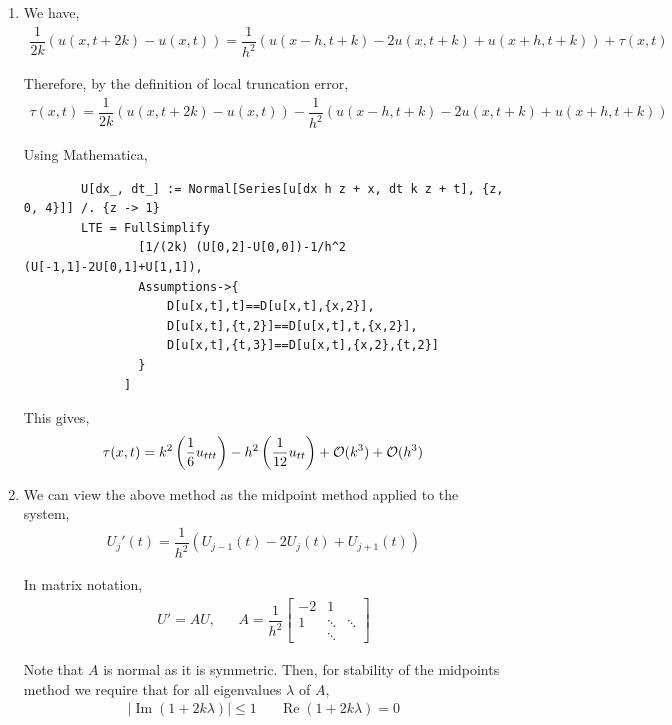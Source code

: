 \documentclass[10pt]{article}
\begin{document}
\begin{solution}[Solution]

\begin{enumerate}[label=(\alph*)]
    \item We have,
    \begin{align*}
        \dfrac{1}{2k}(u(x,t+2k) - u(x,t)) = \dfrac{1}{h^2} \left( u(x-h,t+k) - 2u(x,t+k) + u(x+h,t+k) \right) + \tau(x,t)
    \end{align*}

    Therefore, by the definition of local truncation error,
    \begin{align*}
        \tau(x,t) =\dfrac{1}{2k} \left( u(x,t+2k) - u(x,t) \right) - \dfrac{1}{h^2} \left( u(x-h,t+k) - 2u(x,t+k) + u(x+h,t+k) \right)
    \end{align*}

    Using Mathematica,
    \begin{lstlisting}
        U[dx_, dt_] := Normal[Series[u[dx h z + x, dt k z + t], {z, 0, 4}]] /. {z -> 1}
        LTE = FullSimplify
                [1/(2k) (U[0,2]-U[0,0])-1/h^2 (U[-1,1]-2U[0,1]+U[1,1]),
                Assumptions->{
                    D[u[x,t],t]==D[u[x,t],{x,2}],
                    D[u[x,t],{t,2}]==D[u[x,t],t,{x,2}],
                    D[u[x,t],{t,3}]==D[u[x,t],{x,2},{t,2}]
                }
              ]
    \end{lstlisting}
    This gives,
    \begin{align*}
        \tau(x,t) = k^2 \left( \dfrac{1}{6}u_{ttt} \right) - h^2 \left( \dfrac{1}{12}u_{tt} \right) + \mathcal{O}(k^3) + \mathcal{O}(h^3)
    \end{align*}

    \item
    We can view the above method as the midpoint method applied to the system,
    \begin{align*}
        U_j'(t) = \dfrac{1}{h^2}(U_{j-1}(t) - 2 U_{j}(t) + U_{j+1}(t))
    \end{align*}

    In matrix notation,
    \begin{align*}
        U' = AU,
        &&A = \dfrac{1}{h^2}\left[\begin{array}{ccccc}-2 & 1 \\
        1 & \ddots & \ddots \\
        & \ddots \end{array}\right]
    \end{align*}

    Note that \( A \) is normal as it is symmetric. Then, for stability of the midpoints method we require that for all eigenvalues \( \lambda \) of \( A \),
    \begin{align*}
        |\operatorname{Im}(1+2k\lambda)|\leq 1 && \operatorname{Re}(1+2k\lambda) = 0
    \end{align*}


\end{enumerate}
\end{solution}
\end{document}
